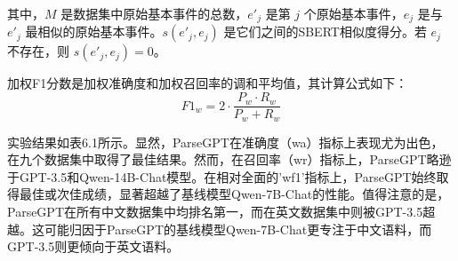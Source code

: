其中，\( M \) 是数据集中原始基本事件的总数，\( e'_j \) 是第 \( j \) 个原始基本事件，\( e_j \) 是与 \( e'_j \) 最相似的原始基本事件。\( s(e'_j, e_j) \) 是它们之间的SBERT相似度得分。若 \( e_j \) 不存在，则 \( s(e'_j, e_j) = 0 \)。

加权F1分数是加权准确度和加权召回率的调和平均值，其计算公式如下：
\[ F1_w = 2 \cdot \frac{P_w \cdot R_w}{P_w + R_w} \]

实验结果如表6.1所示。显然，ParseGPT在准确度（wa）指标上表现尤为出色，在九个数据集中取得了最佳结果。然而，在召回率（wr）指标上，ParseGPT略逊于GPT-3.5和Qwen-14B-Chat模型。在相对全面的'wf1'指标上，ParseGPT始终取得最佳或次佳成绩，显著超越了基线模型Qwen-7B-Chat的性能。值得注意的是，ParseGPT在所有中文数据集中均排名第一，而在英文数据集中则被GPT-3.5超越。这可能归因于ParseGPT的基线模型Qwen-7B-Chat更专注于中文语料，而GPT-3.5则更倾向于英文语料。

